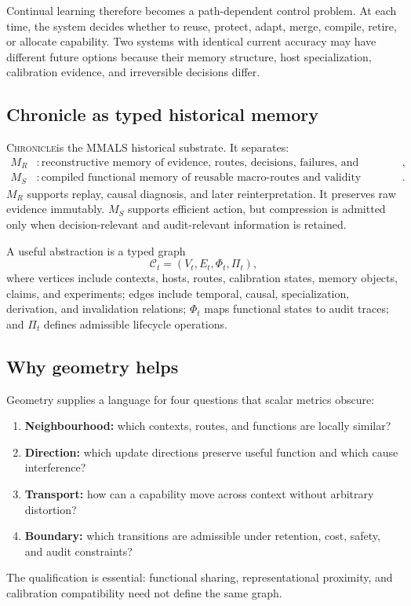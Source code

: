\documentclass[11pt,a4paper]{article}
\newcommand{\Chronicle}{\textsc{Chronicle}}
\begin{document}
Continual learning therefore becomes a path-dependent control problem. At each time, the system decides whether to reuse, protect, adapt, merge, compile, retire, or allocate capability. Two systems with identical current accuracy may have different future options because their memory structure, host specialization, calibration evidence, and irreversible decisions differ.

\subsection{Chronicle as typed historical memory}
\Chronicle is the MMALS historical substrate. It separates:
\begin{align}
M_R &: \text{reconstructive memory of evidence, routes, decisions, failures, and provenance},\\
M_S &: \text{compiled functional memory of reusable macro-routes and validity envelopes}.
\end{align}
$M_R$ supports replay, causal diagnosis, and later reinterpretation. It preserves raw evidence immutably. $M_S$ supports efficient action, but compression is admitted only when decision-relevant and audit-relevant information is retained.

A useful abstraction is a typed graph
\begin{equation}
\mathcal{C}_t=(V_t,E_t,\Phi_t,\Pi_t),
\end{equation}
where vertices include contexts, hosts, routes, calibration states, memory objects, claims, and experiments; edges include temporal, causal, specialization, derivation, and invalidation relations; $\Phi_t$ maps functional states to audit traces; and $\Pi_t$ defines admissible lifecycle operations.

\subsection{Why geometry helps}
Geometry supplies a language for four questions that scalar metrics obscure:
\begin{enumerate}
\item \textbf{Neighbourhood:} which contexts, routes, and functions are locally similar?
\item \textbf{Direction:} which update directions preserve useful function and which cause interference?
\item \textbf{Transport:} how can a capability move across context without arbitrary distortion?
\item \textbf{Boundary:} which transitions are admissible under retention, cost, safety, and audit constraints?
\end{enumerate}
The qualification is essential: functional sharing, representational proximity, and calibration compatibility need not define the same graph.
\end{document}
